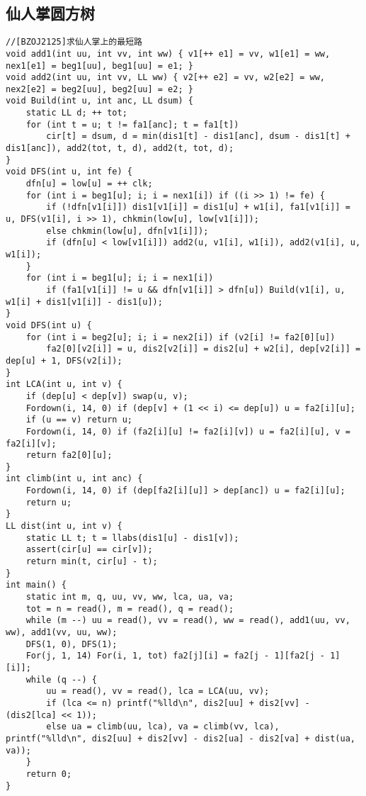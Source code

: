 \documentclass[twocolumn,a4]{article}
\begin{document}
\subsection{仙人掌圆方树}
\begin{lstlisting}
//[BZOJ2125]求仙人掌上的最短路
void add1(int uu, int vv, int ww) { v1[++ e1] = vv, w1[e1] = ww, nex1[e1] = beg1[uu], beg1[uu] = e1; }
void add2(int uu, int vv, LL ww) { v2[++ e2] = vv, w2[e2] = ww, nex2[e2] = beg2[uu], beg2[uu] = e2; }
void Build(int u, int anc, LL dsum) {
    static LL d; ++ tot;
    for (int t = u; t != fa1[anc]; t = fa1[t])
        cir[t] = dsum, d = min(dis1[t] - dis1[anc], dsum - dis1[t] + dis1[anc]), add2(tot, t, d), add2(t, tot, d);
}
void DFS(int u, int fe) {
    dfn[u] = low[u] = ++ clk;
    for (int i = beg1[u]; i; i = nex1[i]) if ((i >> 1) != fe) {
        if (!dfn[v1[i]]) dis1[v1[i]] = dis1[u] + w1[i], fa1[v1[i]] = u, DFS(v1[i], i >> 1), chkmin(low[u], low[v1[i]]);
        else chkmin(low[u], dfn[v1[i]]);
        if (dfn[u] < low[v1[i]]) add2(u, v1[i], w1[i]), add2(v1[i], u, w1[i]);
    }
    for (int i = beg1[u]; i; i = nex1[i])
        if (fa1[v1[i]] != u && dfn[v1[i]] > dfn[u]) Build(v1[i], u, w1[i] + dis1[v1[i]] - dis1[u]);
}
void DFS(int u) {
    for (int i = beg2[u]; i; i = nex2[i]) if (v2[i] != fa2[0][u])
        fa2[0][v2[i]] = u, dis2[v2[i]] = dis2[u] + w2[i], dep[v2[i]] = dep[u] + 1, DFS(v2[i]);
}
int LCA(int u, int v) {
    if (dep[u] < dep[v]) swap(u, v);
    Fordown(i, 14, 0) if (dep[v] + (1 << i) <= dep[u]) u = fa2[i][u];
    if (u == v) return u;
    Fordown(i, 14, 0) if (fa2[i][u] != fa2[i][v]) u = fa2[i][u], v = fa2[i][v];
    return fa2[0][u];
}
int climb(int u, int anc) {
    Fordown(i, 14, 0) if (dep[fa2[i][u]] > dep[anc]) u = fa2[i][u];
    return u;
}
LL dist(int u, int v) {
    static LL t; t = llabs(dis1[u] - dis1[v]);
    assert(cir[u] == cir[v]);
    return min(t, cir[u] - t);
}
int main() {
    static int m, q, uu, vv, ww, lca, ua, va;
    tot = n = read(), m = read(), q = read();
    while (m --) uu = read(), vv = read(), ww = read(), add1(uu, vv, ww), add1(vv, uu, ww);
    DFS(1, 0), DFS(1);
    For(j, 1, 14) For(i, 1, tot) fa2[j][i] = fa2[j - 1][fa2[j - 1][i]];
    while (q --) {
        uu = read(), vv = read(), lca = LCA(uu, vv);
        if (lca <= n) printf("%lld\n", dis2[uu] + dis2[vv] - (dis2[lca] << 1));
        else ua = climb(uu, lca), va = climb(vv, lca), printf("%lld\n", dis2[uu] + dis2[vv] - dis2[ua] - dis2[va] + dist(ua, va));
    }
    return 0;
}
\end{lstlisting}
\end{document}
